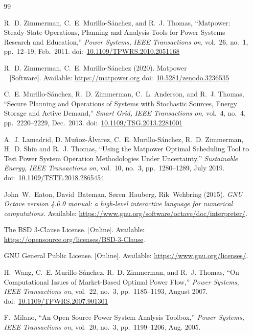 \documentclass[12pt]{article}
\newcommand{\matpower}[0]{{\sc Matpower}}
\newcommand{\doi}[1]{doi:~\href{https://doi.org/#1}{#1}}
\numberwithin{equation}{section}
\numberwithin{table}{section}
\numberwithin{figure}{section}
\begin{document}
\clearpage
\begin{thebibliography}{99}

R.~D. Zimmerman, C.~E. Murillo-S{\'a}nchez, and R.~J. Thomas, ``\matpower{}: Steady-State Operations, Planning and Analysis Tools for Power Systems Research and Education,'' \emph{Power Systems, IEEE Transactions on}, vol.~26, no.~1, pp.~12--19, Feb.~2011.
\doi{10.1109/TPWRS.2010.2051168}

R.~D. Zimmerman, C.~E. Murillo-S{\'a}nchez (2020). \matpower{}\\~
[Software]. Available: \url{https://matpower.org}
\doi{10.5281/zenodo.3236535}

C.~E. Murillo-S{\'a}nchez, R.~D. Zimmerman, C.~L. Anderson, and R.~J. Thomas, ``Secure Planning and Operations of Systems with Stochastic Sources, Energy Storage and Active Demand,'' \emph{Smart Grid, IEEE Transactions on}, vol.~4, no.~4, pp.~2220--2229, Dec.~2013.
\doi{10.1109/TSG.2013.2281001}

A.~J. Lamadrid, D. Mu{\~n}oz-{\'A}lvarez, C.~E. Murillo-S{\'a}nchez, R.~D. Zimmerman, H.~D. Shin and R.~J. Thomas, ``Using the \matpower{} Optimal Scheduling Tool to Test Power System Operation Methodologies Under Uncertainty,'' \emph{Sustainable Energy, IEEE Transactions on}, vol.~10, no.~3, pp.~1280--1289, July 2019.
\doi{10.1109/TSTE.2018.2865454}

John~W.~Eaton, David~Bateman, S{\o}ren~Hauberg, Rik~Wehbring (2015). \emph{GNU Octave version 4.0.0 manual: a high-level interactive language for numerical computations.} Available: \url{https://www.gnu.org/software/octave/doc/interpreter/}.

The BSD 3-Clause License. [Online]. Available: \url{https://opensource.org/licenses/BSD-3-Clause}.

GNU General Public License. [Online]. Available: \url{https://www.gnu.org/licenses/}.

H.~Wang, C.~E. Murillo-S{\'a}nchez, R.~D. Zimmerman, and R.~J. Thomas, ``On
Computational Issues of Market-Based Optimal Power Flow,'' \emph{Power
Systems, IEEE Transactions on}, vol.~22, no.~3, pp.~1185--1193, August 2007.
\doi{10.1109/TPWRS.2007.901301}

F.~Milano, ``An Open Source Power System Analysis Toolbox,'' \emph{Power
  Systems, IEEE Transactions on}, vol.~20, no.~3, pp.~1199--1206, Aug. 2005.


\end{thebibliography}
\end{document}
